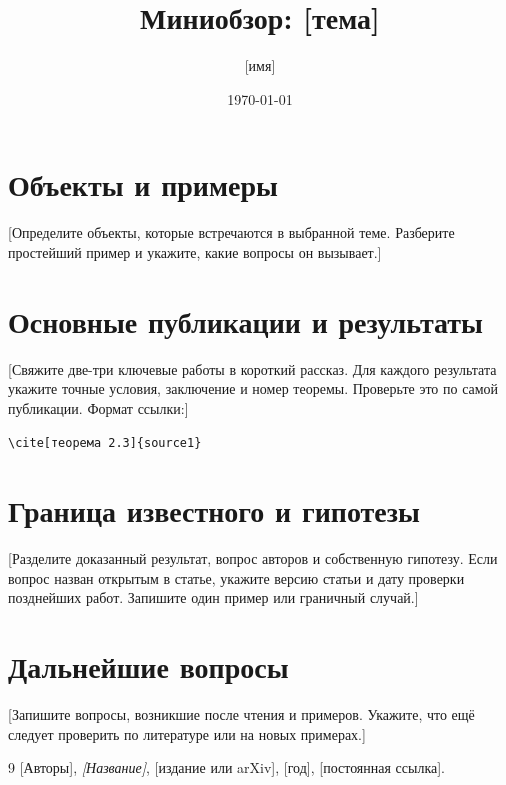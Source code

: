 \documentclass[12pt,a4paper]{article}
\title{Миниобзор: [тема]}
\author{[имя]}
\date{\today}
\begin{document}
\maketitle

\section{Объекты и примеры}
[Определите объекты, которые встречаются в выбранной теме. Разберите
простейший пример и укажите, какие вопросы он вызывает.]

\section{Основные публикации и результаты}
[Свяжите две-три ключевые работы в короткий рассказ. Для каждого результата
укажите точные условия, заключение и номер теоремы. Проверьте это по самой
публикации. Формат ссылки:]

\noindent\verb|\cite[теорема 2.3]{source1}|

\section{Граница известного и гипотезы}
[Разделите доказанный результат, вопрос авторов и собственную гипотезу.
Если вопрос назван открытым в статье, укажите версию статьи и дату проверки
позднейших работ. Запишите один пример или граничный случай.]

\section{Дальнейшие вопросы}
[Запишите вопросы, возникшие после чтения и примеров. Укажите, что ещё
следует проверить по литературе или на новых примерах.]

\begin{thebibliography}{9}
[Авторы], \emph{[Название]}, [издание или arXiv], [год], [постоянная ссылка].
\end{thebibliography}
\end{document}
